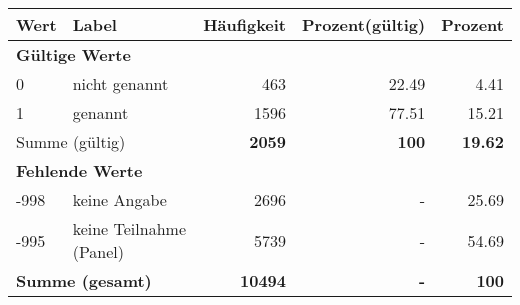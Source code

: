      \begin{longtable}{lXrrr}
     \toprule
     \textbf{Wert} & \textbf{Label} & \textbf{Häufigkeit} & \textbf{Prozent(gültig)} & \textbf{Prozent} \\
     \endhead
     \midrule
     \multicolumn{5}{l}{\textbf{Gültige Werte}}\\

     0 &
     \multicolumn{1}{X}{ nicht genannt   } &


       \num{463} &
       \num[round-mode=places,round-precision=2]{22.49} &
         \num[round-mode=places,round-precision=2]{4.41} \\

     1 &
     \multicolumn{1}{X}{ genannt   } &


       \num{1596} &
       \num[round-mode=places,round-precision=2]{77.51} &
         \num[round-mode=places,round-precision=2]{15.21} \\
     \midrule
     \multicolumn{2}{l}{Summe (gültig)} &
       \textbf{\num{2059}} &
     \textbf{\num{100}} &
       \textbf{\num[round-mode=places,round-precision=2]{19.62}} \\
     \multicolumn{5}{l}{\textbf{Fehlende Werte}}\\
       -998 &
       keine Angabe &
         \num{2696} &
        - &
         \num[round-mode=places,round-precision=2]{25.69} \\
       -995 &
       keine Teilnahme (Panel) &
         \num{5739} &
        - &
         \num[round-mode=places,round-precision=2]{54.69} \\
     \midrule
     \multicolumn{2}{l}{\textbf{Summe (gesamt)}} &
          \textbf{\num{10494}} &
        \textbf{-} &
        \textbf{\num{100}} \\
     \bottomrule
     \end{longtable}
     
